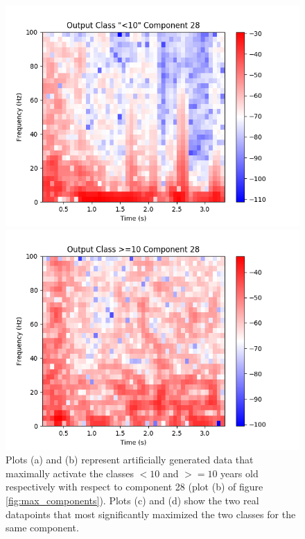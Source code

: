 \documentclass[utf8]{frontiersSCNS} %
\begin{document}
\begin{figure}
\begin{minipage}{0.45\textwidth}
    \includegraphics[width=\linewidth]{max_act/real_0_28.png}
  \end{minipage}
  \hspace*{\fill} 
  \begin{minipage}{0.45\textwidth}
    \includegraphics[width=\linewidth]{max_act/real_1_28.png}
  \end{minipage}
  \caption{Plots (a) and (b) represent artificially generated data that maximally activate the classes $<10$ and $>=10$ years old respectively with respect to component 28 (plot (b) of figure \ref{fig:max_components}). Plots (c) and (d) show the two real datapoints that most significantly maximized the two classes for the same component.}
  \label{fig:component_28}
\end{figure}
\end{document}

